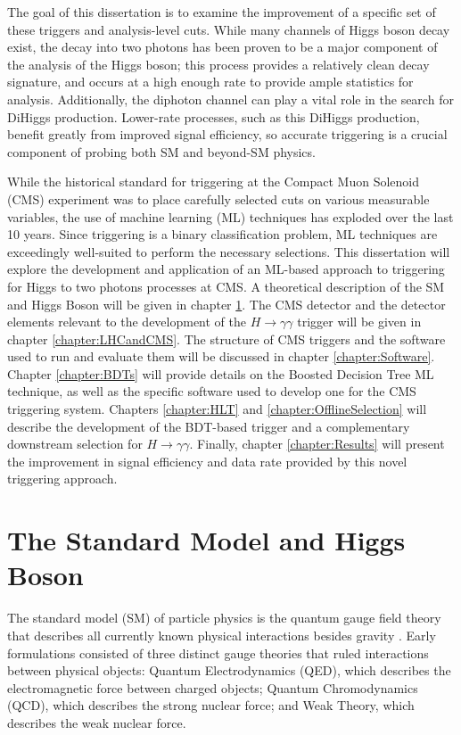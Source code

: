 \documentclass[12pt]{ucsddissertation}
\begin{document}
\begin{dissertationintroduction}
The goal of this dissertation is to examine the improvement of a specific set of these triggers and analysis-level cuts. While many channels of Higgs boson decay exist, the decay into two photons has been proven to be a major component of the analysis of the Higgs boson; this process provides a relatively clean decay signature, and occurs at a high enough rate to provide ample statistics for analysis. Additionally, the diphoton channel can play a vital role in the search for DiHiggs production. Lower-rate processes, such as this DiHiggs production, benefit greatly from improved signal efficiency, so accurate triggering is a crucial component of probing both SM and beyond-SM physics.

While the historical standard for triggering at the Compact Muon Solenoid (CMS) experiment was to place carefully selected cuts on various measurable variables, the use of machine learning (ML) techniques has exploded over the last 10 years. Since triggering is a binary classification problem, ML techniques are exceedingly well-suited to perform the necessary selections. This dissertation will explore the development and application of an ML-based approach to triggering for Higgs to two photons processes at CMS. A theoretical description of the SM and Higgs Boson will be given in chapter \ref{chapter:Theory}. The CMS detector and the detector elements relevant to the development of the $H \rightarrow \gamma \gamma$ trigger will be given in chapter \ref{chapter:LHCandCMS}. The structure of CMS triggers and the software used to run and evaluate them will be discussed in chapter \ref{chapter:Software}. Chapter \ref{chapter:BDTs} will provide details on the Boosted Decision Tree ML technique, as well as the specific software used to develop one for the CMS triggering system. Chapters \ref{chapter:HLT} and \ref{chapter:OfflineSelection} will describe the development of the BDT-based trigger and a complementary downstream selection for $H \rightarrow \gamma\gamma$. Finally, chapter \ref{chapter:Results} will present the improvement in signal efficiency and data rate provided by this novel triggering approach.
\end{dissertationintroduction}

\chapter{The Standard Model and Higgs Boson} \label{chapter:Theory}
The standard model (SM) of particle physics is the quantum gauge field theory that describes all currently known physical interactions besides gravity \cite{SMOverview}. Early formulations consisted of three distinct gauge theories that ruled interactions between physical objects: Quantum Electrodynamics (QED), which describes the electromagnetic force between charged objects; Quantum Chromodynamics (QCD), which describes the strong nuclear force; and Weak Theory, which describes the weak nuclear force. 
\end{document}
